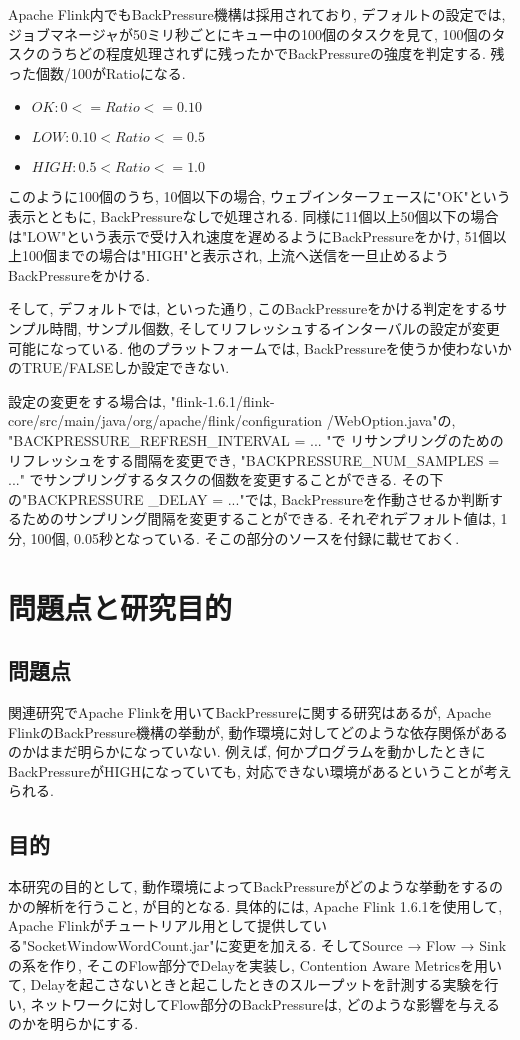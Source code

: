 \documentclass[11pt]{jreport}
\begin{document}
Apache Flink内でもBackPressure機構は採用されており, デフォルトの設定では, ジョブマネージャが50ミリ秒ごとにキュー中の100個のタスクを見て, 100個のタスクのうちどの程度処理されずに残ったかでBackPressureの強度を判定する. 残った個数/100がRatioになる.
\begin{itemize}
  \item $OK: 0 <= Ratio <= 0.10$
  \item $LOW: 0.10 < Ratio <= 0.5$
  \item $HIGH: 0.5 < Ratio <= 1.0$
  \end{itemize} 
このように100個のうち, 10個以下の場合, ウェブインターフェースに"OK"という表示とともに, BackPressureなしで処理される.  
 同様に11個以上50個以下の場合は"LOW"という表示で受け入れ速度を遅めるようにBackPressureをかけ, 51個以上100個までの場合は"HIGH"と表示され, 上流へ送信を一旦止めるようBackPressureをかける. 

そして, デフォルトでは, といった通り, このBackPressureをかける判定をするサンプル時間, サンプル個数, そしてリフレッシュするインターバルの設定が変更可能になっている. 他のプラットフォームでは, BackPressureを使うか使わないかのTRUE/FALSEしか設定できない.

設定の変更をする場合は, "flink-1.6.1/flink-core/src/main/java/org/apache/flink/configuration
/WebOption.java"の, 
"BACKPRESSURE\_REFRESH\_INTERVAL = ... "で
リサンプリングのためのリフレッシュをする間隔を変更でき, 
"BACKPRESSURE\_NUM\_SAMPLES = ..." でサンプリングするタスクの個数を変更することができる.
その下の"BACKPRESSURE
\_DELAY = ..."では, BackPressureを作動させるか判断するためのサンプリング間隔を変更することができる.
それぞれデフォルト値は, 1分, 100個, 0.05秒となっている.
そこの部分のソースを付録に載せておく.


\chapter{問題点と研究目的}
\section{問題点}
関連研究でApache Flinkを用いてBackPressureに関する研究はあるが, Apache FlinkのBackPressure機構の挙動が, 
動作環境に対してどのような依存関係があるのかはまだ明らかになっていない. 
例えば, 何かプログラムを動かしたときにBackPressureがHIGHになっていても, 対応できない環境があるということが考えられる. 

\section{目的}
本研究の目的として, 動作環境によってBackPressureがどのような挙動をするのかの解析を行うこと, が目的となる. 
具体的には, Apache Flink 1.6.1を使用して, Apache Flinkがチュートリアル用として提供している"SocketWindowWordCount.jar"に変更を加える. 
そしてSource → Flow → Sinkの系を作り, そこのFlow部分でDelayを実装し, Contention Aware Metrics\cite{cam}を用いて, Delayを起こさないときと起こしたときのスループットを計測する実験を行い, ネットワークに対してFlow部分のBackPressureは, どのような影響を与えるのかを明らかにする. 
 
\end{document}
